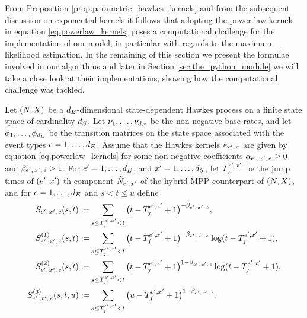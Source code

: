 \documentclass[10pt, article,table]{article}
\begin{document}
From Proposition \ref{prop.parametric_hawkes_kernels} and from the subsequent discussion on exponential kernels it follows that adopting the power-law kernels in equation \eqref{eq.powerlaw_kernels} poses a computational challenge for the implementation of our model, in particular with regards to the maximum likelihood estimation. In the remaining of this section we present the formulae involved in our algorithms and later in Section \ref{sec.the_python_module} we will take a close look at their implementations, showing how the computational challenge was tackled. 

\begin{prop}\label{prop.intensity_and_compensator_powerlaw}
 Let $(\multiCountingProc,\stateVariable)$ be a $\numEventTypes$-dimensional state-dependent Hawkes process on a finite state space of cardinality $\numStates$. Let $\baseRate_1, \dots, \baseRate_{\numEventTypes}$ be the non-negative base rates, and let $\transProb_1, \dots,\transProb_{\numEventTypes}$ be the transition matrices on the state space associated with the event types $e=1, \dots, \numEventTypes$. Assume that the Hawkes kernels $\hawkesKernel\subscriptee$ are given by equation \eqref{eq.powerlaw_kernels} for some non-negative coefficients $\impCoef\subscriptexe \geq 0$ and $\decCoef\subscriptexe > 1$.  For $\eone = 1,\dots,\numEventTypes$, and $\xone=1,\dots,\numStates$, let $\arrivalTimes[\eone,\xone]_j$ be the jump times of $(\eone,\xone)$-th component $\hybridHawkes_{\eone,\xone}$ of the hybrid-MPP counterpart of $(\multiCountingProc,\stateVariable)$, and for $e = 1,\dots,\numEventTypes$ and $s<t\leq u$ define
 \begin{equation}\label{eq.definitions_of_ESSE}
  \begin{split}
   \ESSE\subscriptexe(s,t):=& \sum_{s\leq \arrivalTimes[\eone,\xone]_j < t}\big(t-\arrivalTimes[\eone,\xone]_j +1\big)^{-\decCoef\subscriptexe},
   \\
   \ESSEone\subscriptexe(s,t):=& \sum_{s\leq \arrivalTimes[\eone,\xone]_j < t}\big(t-\arrivalTimes[\eone,\xone]_j +1\big)^{-\decCoef\subscriptexe}\log(t-\arrivalTimes[\eone,\xone]_j +1),
   \\
   \ESSEtwo\subscriptexe(s,t):=& \sum_{s\leq \arrivalTimes[\eone,\xone]_j < t}\big(t-\arrivalTimes[\eone,\xone]_j +1\big)^{1-\decCoef\subscriptexe}\log(t-\arrivalTimes[\eone,\xone]_j +1),
   \\
   \ESSEthree\subscriptexe(s,t,u):=& \sum_{s\leq \arrivalTimes[\eone,\xone]_j < t}\big(u-\arrivalTimes[\eone,\xone]_j +1\big)^{1-\decCoef\subscriptexe}.

\end{split}
\end{equation}
\end{prop}
\end{document}
